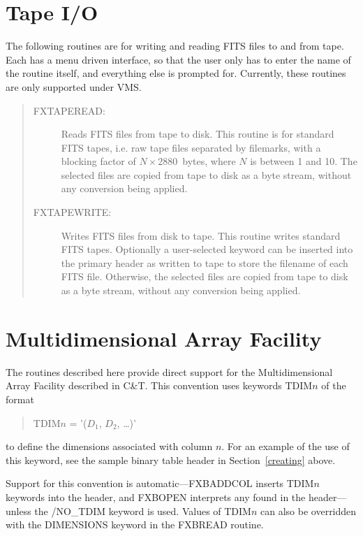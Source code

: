 \section{Tape I/O}

The following routines are for writing and reading FITS files to and from tape.
Each has a menu driven interface, so that the user only has to enter the name
of the routine itself, and everything else is prompted for.  Currently, these
routines are only supported under VMS.
\begin{quote}
\begin{description}
\item[FXTAPEREAD:]
Reads FITS files from tape to disk.  This routine is for standard FITS tapes,
i.e. raw tape files separated by filemarks, with a blocking factor of \mbox{$N
\times 2880$}~bytes, where $N$ is between 1 and 10.  The selected files are
copied from tape to disk as a byte stream, without any conversion being
applied.
\item[FXTAPEWRITE:]
Writes FITS files from disk to tape.  This routine writes standard FITS tapes.
Optionally a user-selected keyword can be inserted into the primary header as
written to tape to store the filename of each FITS file.  Otherwise, the
selected files are copied from tape to disk as a byte stream, without any
conversion being applied.
\end{description}
\end{quote}

\section{Multidimensional Array Facility}
\label{tdim}

The routines described here provide direct support for the Multidimensional
Array Facility described in C\&T\@.  This convention uses keywords TDIM$n$ of
the format
\begin{quote}
TDIM$n$ = '($D_1$, $D_2$, \ldots)'
\end{quote}
to define the dimensions associated with column $n$.  For an example of the use
of this keyword, see the sample binary table header in Section~\ref{creating}
above.

Support for this convention is automatic---FXBADDCOL inserts TDIM$n$ keywords
into the header, and FXBOPEN interprets any found in the header---unless the
/NO\_TDIM keyword is used.  Values of TDIM$n$ can also be overridden with the
DIMENSIONS keyword in the FXBREAD routine.

